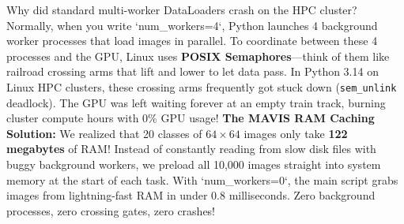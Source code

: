 \documentclass[11pt,a4paper]{article}
\begin{document}
\begin{callout}
Why did standard multi-worker DataLoaders crash on the HPC cluster?\newline
Normally, when you write `num_workers=4`, Python launches 4 background worker processes that load images in parallel. To coordinate between these 4 processes and the GPU, Linux uses \textbf{POSIX Semaphores}—think of them like railroad crossing arms that lift and lower to let data pass.\newline
In Python 3.14 on Linux HPC clusters, these crossing arms frequently got stuck down (\texttt{sem\_unlink} deadlock). The GPU was left waiting forever at an empty train track, burning cluster compute hours with 0\% GPU usage!\newline
\textbf{The MAVIS RAM Caching Solution:} We realized that 20 classes of $64 \times 64$ images only take \textbf{122 megabytes} of RAM! Instead of constantly reading from slow disk files with buggy background workers, we preload all 10,000 images straight into system memory at the start of each task. With `num_workers=0`, the main script grabs images from lightning-fast RAM in under $0.8$ milliseconds. Zero background processes, zero crossing gates, zero crashes!
\end{callout}
\end{document}
